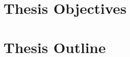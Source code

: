 \section{Thesis Objectives} \label{sec:thesis_objectives}






\section{Thesis Outline} \label{sec:thesis_outline}
